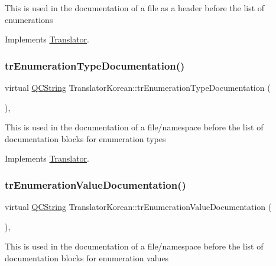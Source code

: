 This is used in the documentation of a file as a header before the list of enumerations 

Implements \mbox{\hyperlink{class_translator}{Translator}}.

\mbox{\label{class_translator_korean_a289c01f6511e838a3e2f85660e9cf4ce}} 
\subsubsection{\texorpdfstring{trEnumerationTypeDocumentation()}{trEnumerationTypeDocumentation()}}
{\footnotesize\ttfamily virtual \mbox{\hyperlink{class_q_c_string}{Q\+C\+String}} Translator\+Korean\+::tr\+Enumeration\+Type\+Documentation (\begin{DoxyParamCaption}{ }\end{DoxyParamCaption})\hspace{0.3cm}{\ttfamily [inline]}, {\ttfamily [virtual]}}

This is used in the documentation of a file/namespace before the list of documentation blocks for enumeration types 

Implements \mbox{\hyperlink{class_translator}{Translator}}.

\mbox{\label{class_translator_korean_af6d9e6bc52deeeca5ead7f9083f8099b}} 
\subsubsection{\texorpdfstring{trEnumerationValueDocumentation()}{trEnumerationValueDocumentation()}}
{\footnotesize\ttfamily virtual \mbox{\hyperlink{class_q_c_string}{Q\+C\+String}} Translator\+Korean\+::tr\+Enumeration\+Value\+Documentation (\begin{DoxyParamCaption}{ }\end{DoxyParamCaption})\hspace{0.3cm}{\ttfamily [inline]}, {\ttfamily [virtual]}}

This is used in the documentation of a file/namespace before the list of documentation blocks for enumeration values 

